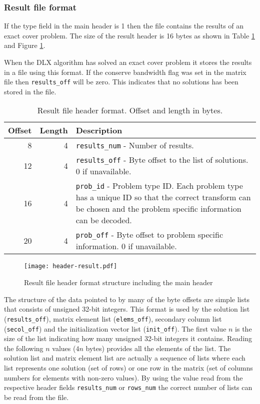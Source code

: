 \subsubsection{Result file format}

If the type field in the main header is 1 then the file contains the results of an exact cover problem.
The size of the result header is 16 bytes as shown in Table \ref{tab:header-result} and Figure \ref{fig:header-result}.

When the DLX algorithm has solved an exact cover problem it stores the results in a file using this format.
If the conserve bandwidth flag was set in the matrix file then \texttt{results\_off} will be zero.
This indicates that no solutions has been stored in the file.

\begin{table}[htbp]
	\centering
	\begin{tabular}{|r|r|p{3.2in}|}
		\hline
		\bf Offset & \bf Length & \bf Description \\ \hline
		8  & 4 & \texttt{results\_num} - Number of results. \\ \hline
		12 & 4 & \texttt{results\_off} - Byte offset to the list of solutions. 0 if unavailable. \\ \hline
		16 & 4 & \texttt{prob\_id} - Problem type ID. Each problem type has a unique ID so that the correct transform can be chosen and the problem specific information can be decoded. \\ \hline
		20 & 4 & \texttt{prob\_off} - Byte offset to problem specific information. 0 if unavailable. \\ \hline
	\end{tabular}
	\caption{Result file header format. Offset and length in bytes.}
	\label{tab:header-result}
\end{table}

\begin{figure}[htbp]
	\centering
	\texttt{[image: header-result.pdf]}
	\caption{Result file header format structure including the main header}
	\label{fig:header-result}
\end{figure}



The structure of the data pointed to by many of the byte offsets are simple lists that consists of unsigned 32-bit integers.
This format is used by the solution list (\texttt{results\_off}), matrix element list (\texttt{elems\_off}), secondary column list (\texttt{secol\_off}) and the initialization vector list (\texttt{init\_off}).
The first value $n$ is the size of the list indicating how many unsigned 32-bit integers it contains.
Reading the following $n$ values ($4n$ bytes) provides all the elements of the list.
The solution list and matrix element list are actually a sequence of lists where each list represents one solution (set of rows) or one row in the matrix (set of columns numbers for elements with non-zero values).
By using the value read from the respective header fields \texttt{results\_num} or \texttt{rows\_num} the correct number of lists can be read from the file.
